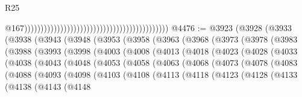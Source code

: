 \begin{lexlean}{R25}
\begin{coremodule}
                                                                                            @167))))))))))))))))))))))))))))))))))))))))))))
@4476 := @3923
    (@3928
      (@3933
        (@3938
          (@3943
            (@3948
              (@3953
                (@3958
                  (@3963
                    (@3968
                      (@3973
                        (@3978
                          (@3983
                            (@3988
                              (@3993
                                (@3998
                                  (@4003
                                    (@4008
                                      (@4013
                                        (@4018
                                          (@4023
                                            (@4028
                                              (@4033
                                                (@4038
                                                  (@4043
                                                    (@4048
                                                      (@4053
                                                        (@4058
                                                          (@4063
                                                            (@4068
                                                              (@4073
                                                                (@4078
                                                                  (@4083
                                                                    (@4088
                                                                      (@4093
                                                                        (@4098
                                                                          (@4103
                                                                            (@4108
                                                                              (@4113
                                                                                (@4118
                                                                                  (@4123
                                                                                    (@4128
                                                                                      (@4133
                                                                                        (@4138
                                                                                          (@4143
                                                                                            (@4148

\end{coremodule}
\end{lexlean}
